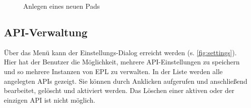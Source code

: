 \begin{figure}[h!]
    \centering
    \setlength\fboxsep{0pt}
	  \caption{Anlegen eines neuen Pads}
	  \label{fig:create}
\end{figure}

\subsection{API-Verwaltung}
Über das Menü kann der Einstellungs-Dialog erreicht werden (s. \autoref{fig:settings}).
Hier hat der Benutzer die Möglichkeit, mehrere API-Einstellungen zu speichern und so mehrere Instanzen von EPL zu verwalten.
In der Liste werden alle angelegten APIs gezeigt.
Sie können durch Anklicken aufgerufen und anschließend bearbeitet, gelöscht und aktiviert werden.
Das Löschen einer aktiven oder der einzigen API ist nicht möglich.


